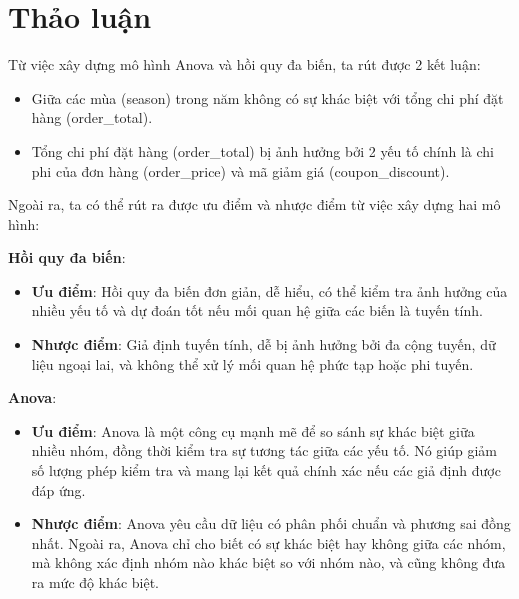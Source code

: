 \section{Thảo luận}
Từ việc xây dựng mô hình Anova và hồi quy đa biến, ta rút được 2 kết luận:
\begin{itemize} 
    \setlength{\itemsep}{0pt}

    \item 
Giữa các mùa (season) trong năm không có sự khác biệt với tổng chi phí đặt hàng (order\_total).
    \item 
 Tổng chi phí đặt hàng (order\_total) bị ảnh hưởng bởi 2 yếu tố chính là chi phi của đơn hàng (order\_price) và mã giảm giá (coupon\_discount).
\end{itemize}
Ngoài ra, ta có thể rút ra được ưu điểm và nhược điểm từ việc xây dựng hai mô hình:

\textbf{Hồi quy đa biến}:
\begin{itemize}
    \item \textbf{Ưu điểm}: Hồi quy đa biến đơn giản, dễ hiểu, có thể kiểm tra ảnh hưởng của nhiều yếu tố và dự đoán tốt nếu mối quan hệ giữa các biến là tuyến tính.
    \item \textbf{Nhược điểm}: Giả định tuyến tính, dễ bị ảnh hưởng bởi đa cộng tuyến, dữ liệu ngoại lai, và không thể xử lý mối quan hệ phức tạp hoặc phi tuyến.
\end{itemize}

\textbf{Anova}:
\begin{itemize}
    \item \textbf{Ưu điểm}: Anova là một công cụ mạnh mẽ để so sánh sự khác biệt giữa nhiều nhóm, đồng thời kiểm tra sự tương tác giữa các yếu tố. Nó giúp giảm số lượng phép kiểm tra và mang lại kết quả chính xác nếu các giả định được đáp ứng.
    \item  \textbf{Nhược điểm}: Anova yêu cầu dữ liệu có phân phối chuẩn và phương sai đồng nhất. Ngoài ra, Anova chỉ cho biết có sự khác biệt hay không giữa các nhóm, mà không xác định nhóm nào khác biệt so với nhóm nào, và cũng không đưa ra mức độ khác biệt.
    
\end{itemize}

